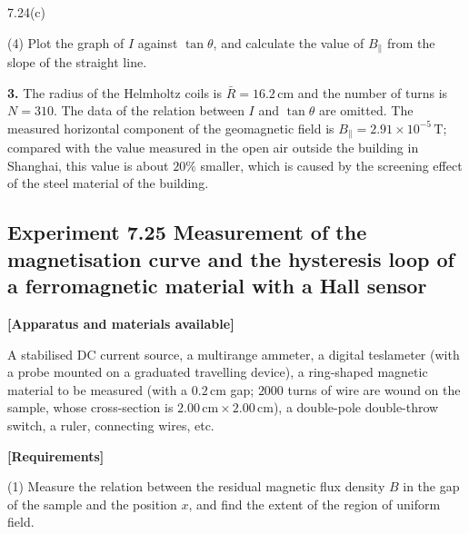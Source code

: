 \begin{figbox}{7.24(c)}
\end{figbox}

(4) Plot the graph of $I$ against $\tan\theta$, and calculate the value of $B_\parallel$ from the slope of the straight line.

\textbf{3.} The radius of the Helmholtz coils is $\bar{R}=16.2\,\mathrm{cm}$ and the number of turns is $N=310$. The data of the relation between $I$ and $\tan\theta$ are omitted. The measured horizontal component of the geomagnetic field is $B_\parallel=2.91\times10^{-5}\,\mathrm{T}$; compared with the value measured in the open air outside the building in Shanghai, this value is about $20\%$ smaller, which is caused by the screening effect of the steel material of the building.

\subsection*{Experiment 7.25 \quad Measurement of the magnetisation curve and the hysteresis loop of a ferromagnetic material with a Hall sensor}

\textbf{[Apparatus and materials available]}

A stabilised DC current source, a multirange ammeter, a digital teslameter (with a probe mounted on a graduated travelling device), a ring-shaped magnetic material to be measured (with a $0.2\,\mathrm{cm}$ gap; $2000$ turns of wire are wound on the sample, whose cross-section is $2.00\,\mathrm{cm}\times2.00\,\mathrm{cm}$), a double-pole double-throw switch, a ruler, connecting wires, etc.

\textbf{[Requirements]}

(1) Measure the relation between the residual magnetic flux density $B$ in the gap of the sample and the position $x$, and find the extent of the region of uniform field.

